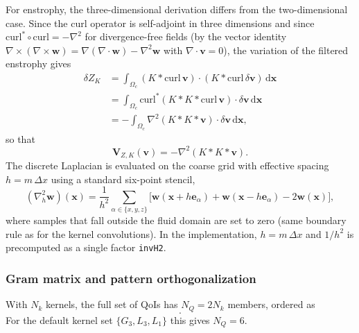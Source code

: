 \documentclass[]{elsarticle}
\newcommand{\D}{\mathrm{d}}
\begin{document}
For enstrophy, the three-dimensional derivation differs from the two-dimensional case. Since the curl operator is self-adjoint in three dimensions and since $\text{curl}^* \circ \text{curl} = -\nabla^2$ for divergence-free fields (by the vector identity $\nabla\times(\nabla\times\boldsymbol{w}) = \nabla(\nabla\cdot\boldsymbol{w})-\nabla^2\boldsymbol{w}$ with $\nabla\cdot\boldsymbol{v}=0$), the variation of the filtered enstrophy gives
\begin{align}
    \delta Z_K &= \int_{\Omega_c} (K*\text{curl}\,\boldsymbol{v}) \cdot (K*\text{curl}\,\delta\boldsymbol{v}) \, \D\boldsymbol{x} \nonumber \\
    &= \int_{\Omega_c} \text{curl}^*\!\left(K*K*\text{curl}\,\boldsymbol{v}\right) \cdot \delta\boldsymbol{v} \, \D\boldsymbol{x} \nonumber \\
    &= -\int_{\Omega_c} \nabla^2(K*K*\boldsymbol{v}) \cdot \delta\boldsymbol{v} \, \D\boldsymbol{x},
\end{align}
so that
\begin{equation}
    \mathbf{V}_{Z,K}(\boldsymbol{v}) = -\nabla^2(K * K * \boldsymbol{v}).
\end{equation}
The discrete Laplacian is evaluated on the coarse grid with effective spacing $h = m\,\Delta x$ using a standard six-point stencil,
\begin{equation} \label{eq:discrete-laplacian}
    (\nabla^2_h \boldsymbol{w})(\boldsymbol{x})
    = \frac{1}{h^2} \sum_{\alpha \in \{x,y,z\}} \bigl[\boldsymbol{w}(\boldsymbol{x}+h\boldsymbol{e}_\alpha) + \boldsymbol{w}(\boldsymbol{x}-h\boldsymbol{e}_\alpha) - 2\boldsymbol{w}(\boldsymbol{x})\bigr],
\end{equation}
where samples that fall outside the fluid domain are set to zero (same boundary rule as for the kernel convolutions). In the implementation, $h = m\,\Delta x$ and $1/h^2$ is precomputed as a single factor \texttt{invH2}.

\subsubsection{Gram matrix and pattern orthogonalization}

With $N_k$ kernels, the full set of QoIs has $N_Q = 2N_k$ members, ordered as
\begin{equation}
    [E_{K_1}, \ldots, E_{K_{N_k}},\; Z_{K_1}, \ldots, Z_{K_{N_k}}].
\end{equation}
For the default kernel set $\{G_3, L_3, L_1\}$ this gives $N_Q = 6$.
\end{document}
